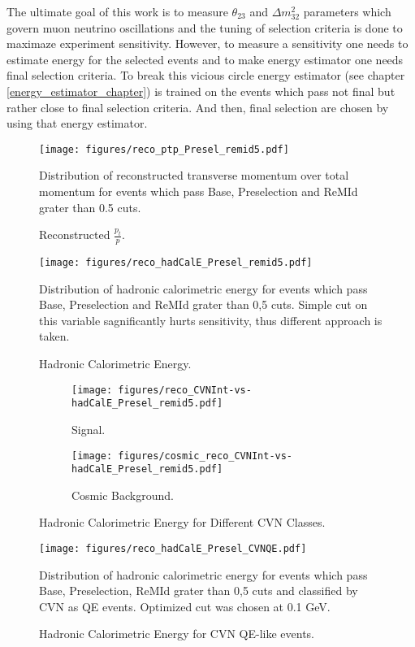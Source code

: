 The ultimate goal of this work is to measure $\theta_{23}$ and $\Delta m^2_{32}$ parameters which govern muon
neutrino oscillations and the tuning of selection criteria is done to maximaze experiment sensitivity. However,
to measure a sensitivity one needs to estimate energy for the selected events and to make energy estimator one 
needs final selection criteria. To break this vicious circle energy estimator (see chapter \ref{energy_estimator_chapter})
is trained on the events which pass not final but rather close to final selection criteria. And then, final 
selection are chosen by using that energy estimator.
\begin{figure}[h]
\centering
\texttt{[image: figures/reco\_ptp\_Presel\_remid5.pdf]}
\caption{Reconstructed $\frac{p_t}{p}$.}
{Distribution of reconstructed transverse momentum over total momentum for events which pass Base, Preselection and
ReMId grater than 0.5 cuts. }
\label{fig:ptp}
\end{figure}
\begin{figure}[h]
\centering
\texttt{[image: figures/reco\_hadCalE\_Presel\_remid5.pdf]}
\caption{Hadronic Calorimetric Energy.}
{Distribution of hadronic calorimetric energy for events which pass Base, Preselection and ReMId grater than 0,5 cuts. 
Simple cut on this variable sagnificantly hurts sensitivity, thus different approach is taken.}
\label{fig:calHadE}
\end{figure}
\begin{figure}[!th]
\begin{subfigure}[t]{0.95\textwidth}
  \centering
  \texttt{[image: figures/reco\_CVNInt-vs-hadCalE\_Presel\_remid5.pdf]}
  \caption{Signal.}
  \label{fig:cvnVsHadE_sig}
\end{subfigure}
\vspace{0.5cm}
\newline
\begin{subfigure}[t]{0.95\textwidth}
  \centering
  \texttt{[image: figures/cosmic\_reco\_CVNInt-vs-hadCalE\_Presel\_remid5.pdf]}
  \caption{Cosmic Background.}
  \label{fig:cvnVsHadE_bkg}
\end{subfigure}
\caption{ Hadronic Calorimetric Energy for Different CVN Classes.  }
\label{fig:cvnVsHadE}
\end{figure}

\begin{figure}[h]
\centering
\texttt{[image: figures/reco\_hadCalE\_Presel\_CVNQE.pdf]}
\caption{Hadronic Calorimetric Energy for CVN QE-like events.}
{Distribution of hadronic calorimetric energy for events which pass Base, Preselection, ReMId grater than 0,5 cuts and 
classified by CVN as QE events. Optimized cut was chosen at 0.1 GeV. }
\label{fig:calHadEVNQE}
\end{figure}

